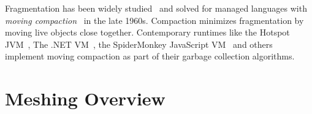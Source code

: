 Fragmentation has been widely
studied~\cite{johnstone:1998:fragmentation} and solved for managed
languages with \textit{moving
  compaction}~\cite{hansen:1969:compaction,fenichel:1969:compaction}
in the late 1960s.  Compaction minimizes fragmentation by moving live
objects close together.  Contemporary runtimes like the Hotspot
JVM~\cite{microystems2006memory}, The .NET
VM~\cite{microsoft:dotnet-gc}, the SpiderMonkey JavaScript
VM~\cite{mozilla:spidermonkey-compaction} and others implement moving
compaction as part of their garbage collection algorithms.






\section{Meshing Overview}
\label{sec:meshing}

